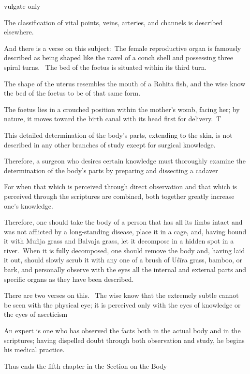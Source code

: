 \begin{translation}
\begin{tt}
\item[40 \& 41]   vulgate only

\item[42]
The classification of vital points, veins, arteries, and channels is described elsewhere. 

\item[43]
And there is a verse on this subject: The female reproductive organ is famously described as being shaped like the navel of a conch shell and possessing three spiral turns. 
The bed of the foetus is situated within its third turn. 

\item[44]
The shape of the uterus resembles the mouth of a Rohita fish, and the wise know the bed of the foetus to be of that same form. 

\item[45]
The foetus lies in a crouched position within the mother's womb, facing her; by nature, it moves toward the birth canal with its head first for delivery. T

\item[46]
This detailed determination of the body's parts, extending to the skin, is not described in any other branches of study except for surgical knowledge.

\item[47]
Therefore, a surgeon who desires certain knowledge must thoroughly examine the determination of the body's parts by preparing and dissecting a cadaver

\item[48]
For when that which is perceived through direct observation and that which is perceived through the scriptures are combined, both together greatly increase one's knowledge. 

\item[49]
Therefore, one should take the body of a person that has all its limbs intact and was not afflicted by a long-standing disease, place it in a cage, and, having bound it with Muñja grass and Balvaja grass, let it decompose in a hidden spot in a river. When it is fully decomposed, one should remove the body and, having laid it out, should slowly scrub it with any one of a brush of Uśīra grass, bamboo, or bark, and personally observe with the eyes all the internal and external parts and specific organs as they have been described. 
\item[50]
There are two verses on this.  The wise know that the extremely subtle cannot be seen with the physical eye; it is perceived only with the eyes of knowledge or the eyes of asceticism


\item[51]
An expert is one who has observed the facts both in the actual body and in the scriptures; having dispelled doubt through both observation and study, he begins his medical practice. 

Thus ends the fifth chapter in the Section on the Body
\end{tt}
\end{translation}